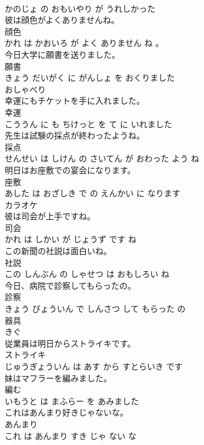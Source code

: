 \documentclass[8pt]{extreport}
\begin{document}
\begin{CJK}{UTF8}{min}
\\	かのじょ の おもいやり が うれしかった			
\\	彼は顔色がよくありませんね。	
\\	顔色 
\\	かれ は かおいろ が よく ありません ね 。			
\\	今日大学に願書を送りました。	
\\	願書 
\\	きょう だいがく に がんしょ を おくりました			
\\	おしゃべり	
\\	幸運にもチケットを手に入れました。	
\\	幸運 
\\	こううん に も ちけっと を て に いれました			
\\	先生は試験の採点が終わったようね。	
\\	採点 
\\	せんせい は しけん の さいてん が おわった よう ね			
\\	明日はお座敷での宴会になります。	
\\	座敷 
\\	あした は おざしき で の えんかい に なります			
\\	カラオケ	
\\	彼は司会が上手ですね。	
\\	司会 
\\	かれ は しかい が じょうず です ね			
\\	この新聞の社説は面白いね。	
\\	社説 
\\	この しんぶん の しゃせつ は おもしろい ね			
\\	今日、病院で診察してもらったの。	
\\	診察 
\\	きょう びょういん で しんさつ して もらった の			
\\	器具	
\\	きぐ			
\\	従業員は明日からストライキです。	
\\	ストライキ 
\\	じゅうぎょういん は あす から すとらいき です			
\\	妹はマフラーを編みました。	
\\	編む 
\\	いもうと は まふらー を あみました			
\\	これはあんまり好きじゃないな。	
\\	あんまり 
\\	これ は あんまり すき じゃ ない な			

\end{CJK}
\end{document}
